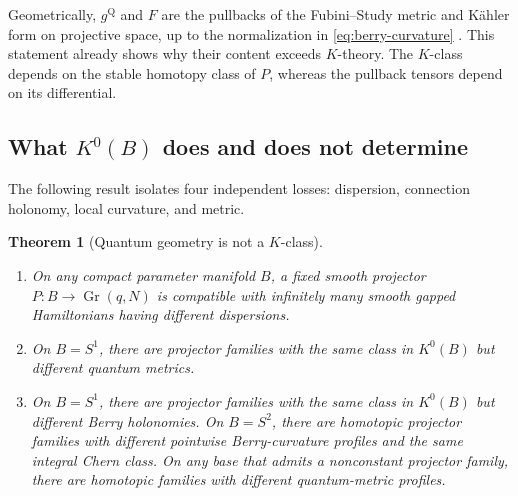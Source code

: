 \documentclass[11pt]{article}
\newtheorem{theorem}{Theorem}[section]
\theoremstyle{definition}
\theoremstyle{remark}
\begin{document}
Geometrically, \(g^{\mathrm Q}\) and \(F\) are the pullbacks of the
Fubini--Study metric and K\"ahler form on projective space, up to the
normalization in \eqref{eq:berry-curvature}
\cite{ProvostVallee,Berry,SimonHolonomy}.  This statement already shows why
their content exceeds \(K\)-theory.  The \(K\)-class depends on the stable
homotopy class of \(P\), whereas the pullback tensors depend on its
differential.

\subsection{What \texorpdfstring{\(K^0(B)\)}{K0(B)} does and does not determine}

The following result isolates four independent losses: dispersion, connection
holonomy, local curvature, and metric.

\begin{theorem}[Quantum geometry is not a \(K\)-class]
\label{thm:qgt-not-k}
\begin{enumerate}[label=\textup{(\alph*)},leftmargin=2.5em]
\item On any compact parameter manifold \(B\), a fixed smooth projector
  \(P:B\to\operatorname{Gr}(q,N)\) is compatible with infinitely many smooth
  gapped Hamiltonians having different dispersions.

\item On \(B=S^1\), there are projector families with the same class in
  \(K^0(B)\) but different quantum metrics.

\item On \(B=S^1\), there are projector families with the same class in
  \(K^0(B)\) but different Berry holonomies.  On \(B=S^2\), there are
  homotopic projector families with different pointwise Berry-curvature
  profiles and the same integral Chern class.  On any base that admits a
  nonconstant projector family, there are homotopic families with different
  quantum-metric profiles.
\end{enumerate}
\end{theorem}
\end{document}
